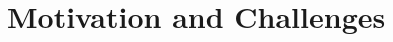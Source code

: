 \documentclass[letterpaper,11pt]{report}
\begin{document}




\chapter{Motivation and Challenges}
\label{chapter:motivation}
\doublespacing





%

%
%


\end{document}
